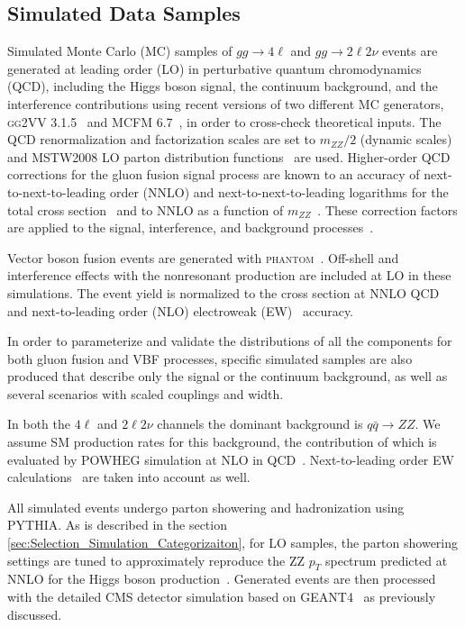 \subsection{Simulated Data Samples}

Simulated Monte Carlo (MC) samples of $gg \to 4\ell$ and $gg \to 2\ell 2\nu$ events are
generated at leading order (LO) in perturbative quantum chromodynamics (QCD), including the Higgs
boson signal, the continuum background, and the interference contributions using recent versions of
two different MC generators, \textsc{gg2VV} 3.1.5~\cite{Kauer:2012hd,Kauer:2013qba} and
\textsc{MCFM 6.7}~\cite{Campbell:2010ff}, in order to cross-check theoretical inputs. The QCD renormalization
and factorization scales are set to $m_{ZZ}/2$ (dynamic scales) and \textsc{MSTW2008} LO parton distribution
functions~\cite{Martin:2009iq} are used. Higher-order QCD corrections for the gluon fusion signal process
are known to an accuracy of next-to-next-to-leading order (NNLO) and next-to-next-to-leading logarithms
for the total cross section~\cite{Dittmaier:2011ti,Heinemeyer:2013tqa} and to
NNLO as a function of $m_{ZZ}$~\cite{Passarino:2013bha}.
These correction factors are applied to the signal, interference, and background processes~\cite{Passarino:2013bha,Bonvini:2013jha}.

Vector boson fusion events are generated with \textsc{phantom}~\cite{Ballestrero:2007xq}.
Off-shell and interference effects with the nonresonant production are included at LO in these simulations.
The event yield is normalized to the cross section at NNLO QCD and next-to-leading order (NLO)
electroweak (EW)~\cite{Dittmaier:2011ti,Heinemeyer:2013tqa} accuracy.

In order to parameterize and validate the distributions of all the components for both gluon fusion and
VBF processes, specific simulated samples are also produced that describe only the signal or the continuum background,
as well as several scenarios with scaled couplings and width.

In both the $4\ell$ and $2\ell2\nu$ channels the dominant background is $q\bar{q} \to ZZ$.
We assume SM production rates for this background, the contribution of which is evaluated by \textsc{POWHEG}
simulation at NLO in QCD~\cite{Melia:2011tj}. Next-to-leading order EW calculations~\cite{Bierweiler:2013dja,Baglio:2013toa} are taken into account as well.

All simulated events undergo parton showering and hadronization using \textsc{PYTHIA}.
As is described in the section \ref{sec:Selection_Simulation_Categorizaiton}, for LO samples, the parton showering settings
are tuned to approximately reproduce the ZZ $p_{T}$ spectrum predicted at NNLO for the Higgs boson
production~\cite{deFlorian:2012mx}. Generated events are then processed with the detailed CMS detector simulation
based on \textsc{GEANT4}~\cite{Allison:2006ve,Agostinelli2003250} as previously discussed.

